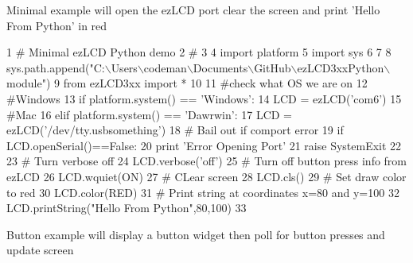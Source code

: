 Minimal example will open the ez\-L\-C\-D port clear the screen and print 'Hello From Python' in red \par
  
\begin{DoxyCodeInclude}
1 \textcolor{comment}{# Minimal ezLCD Python demo}
2 \textcolor{comment}{#}
3 
4 \textcolor{keyword}{import} platform
5 \textcolor{keyword}{import} sys
6 
7 
8 sys.path.append(\textcolor{stringliteral}{"C:\(\backslash\)Users\(\backslash\)codeman\(\backslash\)Documents\(\backslash\)GitHub\(\backslash\)ezLCD3xxPython\(\backslash\)module"}) 
9 \textcolor{keyword}{from} ezLCD3xx \textcolor{keyword}{import} *
10 
11 \textcolor{comment}{#check what OS we are on}
12 \textcolor{comment}{#Windows}
13 \textcolor{keywordflow}{if} platform.system() == \textcolor{stringliteral}{'Windows'}:
14     LCD = ezLCD(\textcolor{stringliteral}{'com6'}) 
15 \textcolor{comment}{#Mac}
16 \textcolor{keywordflow}{elif} platform.system() == \textcolor{stringliteral}{'Dawrwin'}:
17     LCD = ezLCD(\textcolor{stringliteral}{'/dev/tty.usbsomething'})
18 \textcolor{comment}{# Bail out if comport error}
19 \textcolor{keywordflow}{if} LCD.openSerial()==\textcolor{keyword}{False}:
20     \textcolor{keywordflow}{print} \textcolor{stringliteral}{'Error Opening Port'}
21     \textcolor{keywordflow}{raise} SystemExit
22 
23 \textcolor{comment}{# Turn verbose off }
24 LCD.verbose(\textcolor{stringliteral}{'off'})
25 \textcolor{comment}{# Turn off button press info from ezLCD}
26 LCD.wquiet(ON)
27 \textcolor{comment}{# CLear screen}
28 LCD.cls()
29 \textcolor{comment}{# Set draw color to red}
30 LCD.color(RED)
31 \textcolor{comment}{# Print string at coordinates x=80 and y=100}
32 LCD.printString(\textcolor{stringliteral}{"Hello From Python"},80,100)
33 
\end{DoxyCodeInclude}
 Button example will display a button widget then poll for button presses and update screen  
